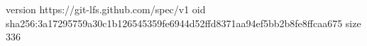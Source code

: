 version https://git-lfs.github.com/spec/v1
oid sha256:3a17295759a30c1b126545359fe6944d52ffd8371aa94ef5bb2b8fe8ffcaa675
size 336
